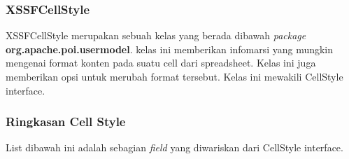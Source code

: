 \subsubsection{XSSFCellStyle}
XSSFCellStyle merupakan sebuah kelas yang berada dibawah \textit{package} \textbf{org.apache.poi.usermodel}. kelas ini memberikan infomarsi yang mungkin mengenai format konten pada suatu cell dari spreadsheet. Kelas ini juga memberikan opsi untuk merubah format tersebut. Kelas ini mewakili CellStyle interface.\cite{apachepoi2}

\subsubsection{Ringkasan Cell Style}
List dibawah ini adalah sebagian \textit{field} yang diwariskan dari CellStyle interface.\cite{tutpoint}\\

